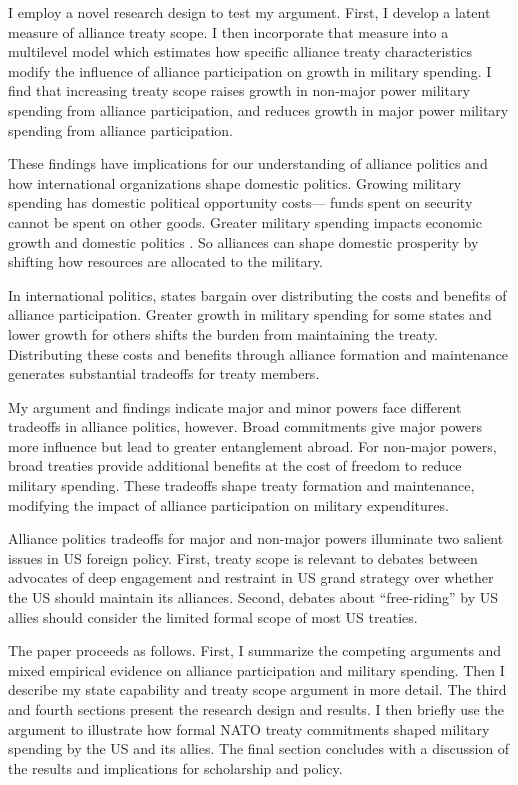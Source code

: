\documentclass[12pt]{article}
\begin{document}
I employ a novel research design to test my argument.
First, I develop a latent measure of alliance treaty scope. 
I then incorporate that measure into a multilevel model which estimates how specific alliance treaty characteristics modify the influence of alliance participation on growth in military spending.
I find that increasing treaty scope raises growth in non-major power military spending from alliance participation, and reduces growth in major power military spending from alliance participation. 


These findings have implications for our understanding of alliance politics and how international organizations shape domestic politics. 
Growing military spending has domestic political opportunity costs--- funds spent on security cannot be spent on other goods. 
Greater military spending impacts economic growth \citep{ShinWard1999, AlptekinLevine2012} and domestic politics \citep{Narizny2003, WhittenWilliams2011, Williams2015}.
So alliances can shape domestic prosperity by shifting how resources are allocated to the military. 


In international politics, states bargain over distributing the costs and benefits of alliance participation.
Greater growth in military spending for some states and lower growth for others shifts the burden from maintaining the treaty. 
Distributing these costs and benefits through alliance formation and maintenance generates substantial tradeoffs for treaty members. 


My argument and findings indicate major and minor powers face different tradeoffs in alliance politics, however.
Broad commitments give major powers more influence but lead to greater entanglement abroad.
For non-major powers, broad treaties provide additional benefits at the cost of freedom to reduce military spending. 
These tradeoffs shape treaty formation and maintenance, modifying the impact of alliance participation on military expenditures. 


Alliance politics tradeoffs for major and non-major powers illuminate two salient issues in US foreign policy. 
First, treaty scope is relevant to debates between advocates of deep engagement \citep{Brooksetal2013} and restraint \citep{Posen2014} in US grand strategy over whether the US should maintain its alliances. 
Second, debates about ``free-riding'' by US allies should consider the limited formal scope of most US treaties. 


The paper proceeds as follows. 
First, I summarize the competing arguments and mixed empirical evidence on alliance participation and military spending. 
Then I describe my state capability and treaty scope argument in more detail. 
The third and fourth sections present the research design and results. 
I then briefly use the argument to illustrate how formal NATO treaty commitments shaped military spending by the US and its allies. 
The final section concludes with a discussion of the results and implications for scholarship and policy.  
\end{document}
